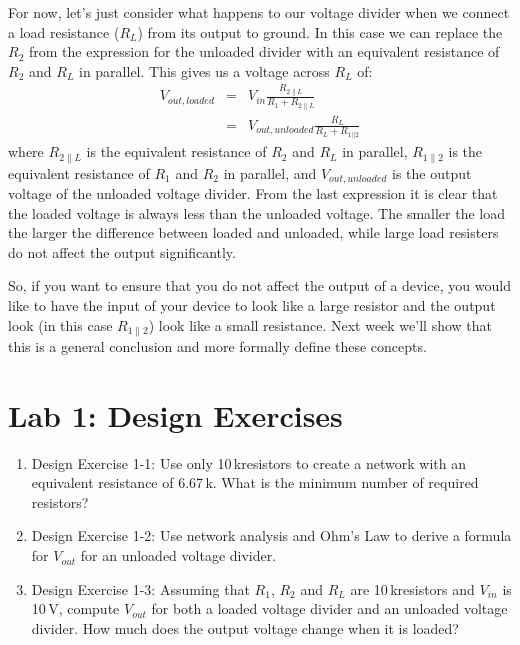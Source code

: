 \documentclass{article}
\begin{document}
For now, let's just consider what happens to our voltage divider when we connect a load resistance ($R_L$) from its output to ground. In this case we can replace the $R_2$ from the expression for the unloaded divider with an equivalent resistance of $R_2$ and $R_L$ in parallel. This gives us a voltage across $R_L$ of:
\begin{eqnarray}
 V_{out,loaded} & = & V_{in} \frac{R_{2 \parallel L}}{R_1 + R_{2\parallel L}} \\
 & = & V_{out,unloaded} \frac{R_L}{R_L + R_{1||2}}
\end{eqnarray}
where $R_{2 \parallel L}$ is the equivalent resistance of $R_2$ and $R_L$ in parallel, $R_{1 \parallel 2}$ is the equivalent resistance of $R_1$ and $R_2$ in parallel, and $V_{out,unloaded}$ is the output voltage of the unloaded voltage divider. From the last expression it is clear that the loaded voltage is always less than the unloaded voltage. The smaller the load the larger the difference between loaded and unloaded, while large load resisters do not affect the output significantly. 

So, if you want to ensure that you do not affect the output of a device, you would like to have the input of your device to look like a large resistor and the output look (in this case $R_{1\parallel 2}$) look like a small resistance. Next week we'll show that this is a general conclusion and more formally define these concepts.


\pagebreak

\section{Lab 1: Design Exercises}

\begin{enumerate}
\item Design Exercise 1-1: Use only 10\,k\Ohm resistors to create a network with an equivalent resistance of 6.67\,k\Ohm. What is the minimum number of required resistors?
\item Design Exercise 1-2: Use network analysis and Ohm's Law to derive a formula for $V_{out}$­ for an unloaded voltage divider.
\item Design Exercise 1-3: Assuming that $R_1$, $R_2$ and $R_L$ are 10\,k\Ohm resistors and $V_{in}$ is 10\,V, compute $V_{out}$ for both a loaded voltage divider and an unloaded voltage divider­. How much does the output voltage change when it is loaded?
\end{enumerate}
\end{document}
